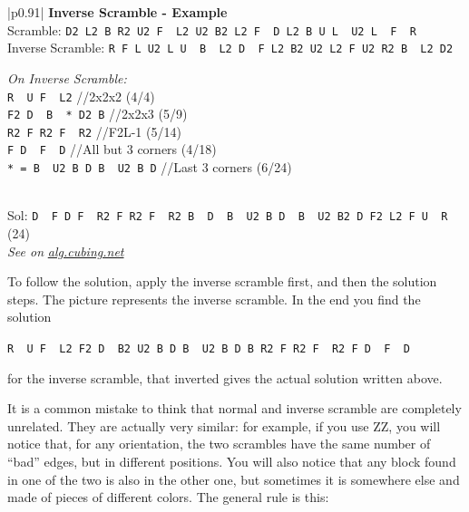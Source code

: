 \documentclass[11pt,a4paper]{book}
\newcommand{\p}{\textquotesingle}
\newcommand{\m}{\texttt}
\newcommand{\ps}{\p\,\,}
\newcommand{\comment}[1]{{\color{gray}\quad//#1}}
\begin{document}
\bigskip
\begin{tabular}{|p{}|}
\hline
\textbf{Inverse Scramble - Example}\\
\hline
Scramble: \m{D2 L2 B R2 U2 F\ps L2 U2 B2 L2 F\ps D L2 B U L\ps U2 L\ps F\ps R\p}\\
Inverse Scramble: \m{R F L U2 L U\ps B\ps L2 D\ps F L2 B2 U2 L2 F U2 R2 B\ps L2 D2}\\
\hline
\begin{minipage}[l]{0.650\textwidth}
\emph{On Inverse Scramble:}\\
\m{R\ps U F\ps L2} \comment{2x2x2 (4/4)}\\
\m{F2 D\ps B\ps * D2 B} \comment{2x2x3 (5/9)}\\
\m{R2 F R2 F\ps R2} \comment{F2L-1 (5/14)}\\
\m{F D\ps F\ps D} \comment{All but 3 corners (4/18)}\\
\m{* = B\ps U2 B D B\ps U2 B D\p} \comment{Last 3 corners (6/24)}
\end{minipage}
\begin{minipage}[c]{0.25\textwidth}

\end{minipage}\\
\hline
Sol: \m{D\ps F D F\ps R2 F R2 F\ps R2 B\ps D\ps B\ps U2 B D\ps B\ps U2 B2 D F2 L2 F U\ps R} (24)\\
\hline
\emph{See on }\href{https://alg.cubing.net/?setup=R_F_L_U2_L_U-_B-_L2_D-_F_L2_B2_U2_L2_F_U2_R2_B-_L2_D2&alg=R-_U_F-_L2_\%2F\%2F2x2x2\%0AF2_D-_B-_(B-_U2_B_D_B-_U2_B_D-)_D2_B_\%2F\%2F2x2x3\%0AR2_F_R2_F-_R2_\%2F\%2FF2L\%26\%2345\%3B1\%0AF_D-_F-_D_\%2F\%2FAll_but_3_corners}{\emph{alg.cubing.net}}\\
\hline
\end{tabular}
\bigskip

To follow the solution, apply the inverse scramble first, and then the solution steps. The picture represents the inverse scramble. In the end you find the solution

\begin{center}
\m{R\ps U F\ps L2 F2 D\ps B2 U2 B D B\ps U2 B D B R2 F R2 F\ps R2 F D\ps F\ps D}
\end{center}

for the inverse scramble, that inverted gives the actual solution written above.

It is a common mistake to think that normal and inverse scramble are completely unrelated. They are actually very similar: for example, if you use ZZ, you will notice that, for any orientation, the two scrambles have the same number of ``bad'' edges, but in different positions. You will also notice that any block found in one of the two is also in the other one, but sometimes it is somewhere else and made of pieces of different colors. The general rule is this:
\end{document}
